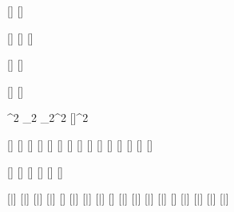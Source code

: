

\varDef{\angleTwo}{\beta}
\varDef{\angleOne}{\alpha}
\varDef{\angleFour}{\Pi}
\varDef{\angleThree}{\Gamma}

[\mathbb]
[\mathbb]

[\mathcal]
[\mathcal]
[\mathbb]

[\mathcal]
[\mathcal]

[\vectorFmt]
[\unitVecFmt]

^{2}
_{2}
_{2}^{2}
[\vectorFmt]^{2}

\varDef{\rbardot}{\rbar}[\dot]
\varDef{\rbarddot}{\rbar}[\ddot]
[\dot]
\varDef{\rhobardot}{\rhobar}[\dot]
\varDef{\rhodot}{\rho}[\dot]
\varDef{\thetadot}{\theta}[\dot]
[\ddot]
[\ddot]
[\dot]
[\ddot]
[\ddot]
[\dot]
[\ddot]
[\ddot]
[\dot]

[\hat]
[\hat]
[\hat]
[\hat]
[\hat]
[\hat]

[\bar]
[\bar]
[\bar]
[\bar]
[\tilde]
[\bar]
[\bar]
[\bar]
\varDef{\qbardot}{\qbar}[\dot]
[\bar]
[\bar]
[\bar]
[\bar]
\varDef{\xbardot}{\xbar}[\dot]
[\bar]
\varDef{\nubar}{\nu}[\bar]
\varDef{\rhobar}{\rho}[\bar]
\varDef{\omegabar}{\omega}[\bar]
